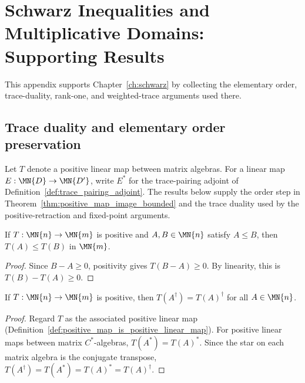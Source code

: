 \chapter{Schwarz Inequalities and Multiplicative Domains: Supporting Results}
\label{ch:schwarz_supporting_results}

This appendix supports Chapter~\ref{ch:schwarz} by collecting the elementary
order, trace-duality, rank-one, and weighted-trace arguments used there.

\section{Trace duality and elementary order preservation}
\label{sec:app_schwarz_trace_order}

Let $T$ denote a positive linear map between matrix algebras. For a linear map
$E:\MN{D}\to\MN{D'}$, write $E^*$ for the trace-pairing adjoint of
Definition~\ref{def:trace_pairing_adjoint}. The results below supply the
order step in Theorem~\ref{thm:positive_map_image_bounded} and the trace
duality used by the positive-retraction and fixed-point arguments.

\begin{theorem}
    \label{thm:positive_map_monotone}
    \leanok
    If $T:\MN{n}\to\MN{m}$ is positive and
    $A,B\in\MN{n}$ satisfy $A\le B$, then $T(A)\le T(B)$ in $\MN{m}$.
\end{theorem}

\begin{proof}
    \leanok
    Since $B-A\ge0$, positivity gives $T(B-A)\ge0$.
    By linearity, this is $T(B)-T(A)\ge0$.
\end{proof}

\begin{theorem}
    \label{thm:positive_map_conjTranspose}
    \leanok
    If $T:\MN{n}\to\MN{m}$ is positive, then
    $T(A^\dagger)=T(A)^\dagger$ for all $A\in\MN{n}$.
\end{theorem}

\begin{proof}
    \leanok
    Regard $T$ as the associated positive linear map
    (Definition~\ref{def:positive_map_is_positive_linear_map}). For positive
    linear maps between matrix $C^*$-algebras, $T(A^\ast)=T(A)^\ast$.
    Since the star on each matrix algebra is the conjugate transpose,
    $T(A^\dagger)=T(A^\ast)=T(A)^\ast=T(A)^\dagger$.
\end{proof}

